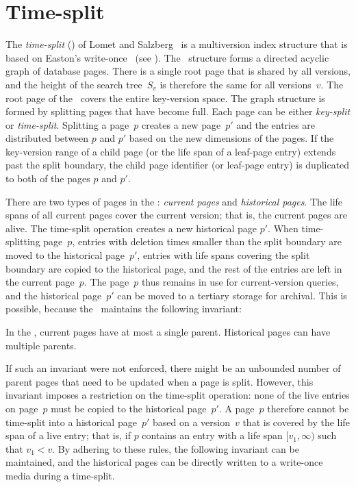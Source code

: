 \section{Time-split \Btree}
\label{sec:tsbmvbt:tsb}
\label{def:tsb}

The \emph{time-split \Btree} (\TSBtree) of Lomet and
Salzberg~\cite{lomet:1989:tsb,lomet:1990:tsb-performance} is a multiversion
index structure that is based on Easton's write-once \Btree\ (see
). 
The \TSBtree\ structure forms a directed acyclic graph of database pages.
There is a single root page that is shared by all versions, and the 
height of the search tree~$S_v$ is therefore the same for all
versions~$v$.
The root page of the \TSBtree\ covers the entire key-version space.
The graph structure is formed by splitting pages that have become full.
Each page can be either \emph{key-split} or \emph{time-split}.
Splitting a page~$p$ creates a new page~$p'$ and the entries are distributed
between $p$ and $p'$ based on the new dimensions of the pages. 
If the key-version range of a child page (or the life span of a
leaf-page entry) extends past the split boundary, the child page identifier
(or leaf-page entry) is duplicated to both of the pages $p$ and $p'$.

There are two types of pages in the \TSBtree: \emph{current pages} and
\emph{historical pages}.
The life spans of all current pages cover the current version; that is, the
current pages are alive.
The time-split operation creates a new historical page $p'$.
When time-splitting page~$p$, entries with deletion times smaller than the
split boundary are moved to the historical page~$p'$, entries with life spans
covering the split boundary are copied to the historical page, and the rest
of the entries are left in the current page~$p$. 
The page~$p$ thus remains in use for current-version queries, and the
historical page~$p'$ can be moved to a tertiary storage for archival.
This is possible, because the \TSBtree\ maintains the following invariant:

\thmskip
\begin{invariant}
\label{inv:tsb:one-parent}
In the \TSBtree, current pages have at most a single parent. 
Historical pages can have multiple parents.
\end{invariant}
\thmskip

If such an invariant were not enforced, there might be an unbounded number
of parent pages that need to be updated when a page is split.
However, this invariant imposes a restriction on the time-split operation:
none of the live entries on page~$p$ must be copied to the historical
page~$p'$. 
A page~$p$ therefore cannot be time-split into a historical page~$p'$ based
on a version~$v$ that is covered by the life span of a live entry; that is,  
if $p$ contains an entry with a life span $[v_1, \infty)$ such that $v_1 <
v$. 
By adhering to these rules, the following invariant can be maintained, and
the historical pages can be directly written to a write-once media
during a time-split.

